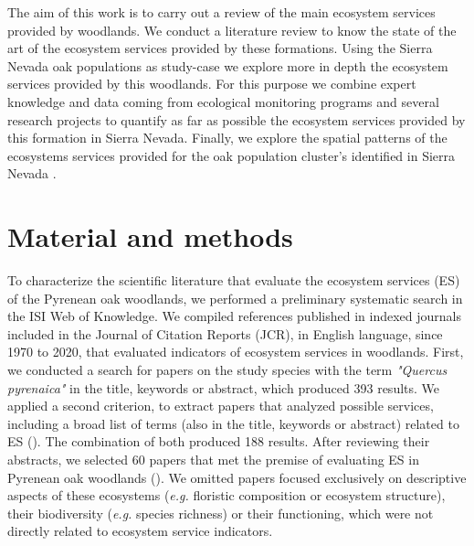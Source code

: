 The aim of this work is to carry out a review of the main ecosystem services provided by \Qp woodlands. We conduct a literature review to know the state of the art of the ecosystem services provided by these formations. Using the Sierra Nevada oak populations as study-case we explore more in depth the ecosystem services provided by this woodlands. For this purpose we combine expert knowledge and data coming from ecological monitoring programs and several research projects to quantify as far as possible the ecosystem services provided by this formation in Sierra Nevada. Finally, we explore the spatial patterns of the ecosystems services provided for the oak population cluster's identified in Sierra Nevada \autocite[see][]{PerezLuqueetal2021EcologicalDiversity}.  

\section{Material and methods}\label{sec:es:mat}

To characterize the scientific literature that evaluate the ecosystem services (ES) of the Pyrenean oak woodlands, we performed a preliminary systematic search in the ISI Web of Knowledge. We compiled references published in indexed journals included in the Journal of Citation Reports (JCR), in English language, since 1970 to 2020, that evaluated indicators of ecosystem services in \Qp woodlands. First, we conducted a search for papers on the study species with the term \emph{"Quercus pyrenaica"} in the title, keywords or abstract, which produced 393 results. We applied a second criterion, to extract papers that analyzed possible services, including a broad list of terms (also in the title, keywords or abstract) related to ES (). The combination of both produced 188 results. After reviewing their abstracts, we selected 60 papers that met the premise of evaluating ES in Pyrenean oak woodlands (). We omitted papers focused exclusively on descriptive aspects of these ecosystems (\emph{e.g.} floristic composition or ecosystem structure), their biodiversity (\emph{e.g.} species richness) or their functioning, which were not directly related to ecosystem service indicators.

